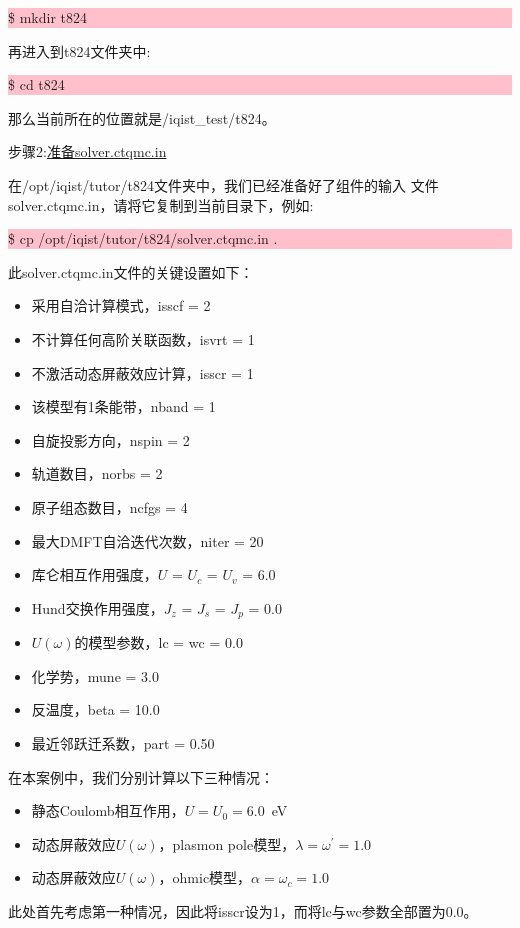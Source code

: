\noindent\colorbox{pink}{\parbox[r]{\linewidth}{\quad \$ mkdir t824 }}

再进入到t824文件夹中:

\noindent\colorbox{pink}{\parbox[r]{\linewidth}{\quad \$ cd t824 }}

那么当前所在的位置就是/iqist\_test/t824。

步骤2:\underline{准备solver.ctqmc.in}

在/opt/iqist/tutor/t824文件夹中，我们已经准备好了{\narcissus}组件的输入
文件solver.ctqmc.in，请将它复制到当前目录下，例如:

\noindent\colorbox{pink}{\parbox[r]{\linewidth}{\quad \$ cp /opt/iqist/tutor/t824/solver.ctqmc.in . }}

此solver.ctqmc.in文件的关键设置如下：
\begin{itemize}
  \item 采用自洽计算模式，isscf = 2
  \item 不计算任何高阶关联函数，isvrt = 1
  \item 不激活动态屏蔽效应计算，isscr = 1
  \item 该模型有1条能带，nband = 1
  \item 自旋投影方向，nspin = 2
  \item 轨道数目，norbs = 2
  \item 原子组态数目，ncfgs = 4
  \item 最大DMFT自洽迭代次数，niter = 20
  \item 库仑相互作用强度，$U$ = $U_{c}$ = $U_{v}$ = 6.0 
  \item Hund交换作用强度，$J_{z}$ = $J_{s}$ = $J_{p}$ = 0.0
  \item $U(\omega)$的模型参数，lc = wc = 0.0
  \item 化学势，mune = 3.0
  \item 反温度，beta = 10.0
  \item 最近邻跃迁系数，part = 0.50
\end{itemize}

在本案例中，我们分别计算以下三种情况：
\begin{itemize}
\item 静态Coulomb相互作用，$U = U_{0} = 6.0$\ eV
\item 动态屏蔽效应$U(\omega)$，plasmon pole模型，$\lambda = \omega^{\prime} = 1.0$
\item 动态屏蔽效应$U(\omega)$，ohmic模型，$\alpha = \omega_{c} = 1.0$
\end{itemize}
此处首先考虑第一种情况，因此将isscr设为1，而将lc与wc参数全部置为0.0。

